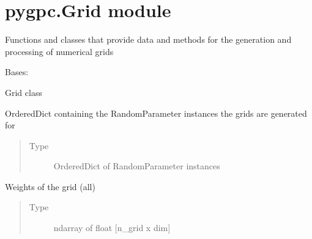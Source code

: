 \documentclass[letterpaper,10pt,english,openany,oneside]{sphinxmanual}
\begin{document}
\section{pygpc.Grid module}
\label{\detokenize{pygpc:module-pygpc.Grid}}\label{\detokenize{pygpc:pygpc-grid-module}}
Functions and classes that provide data and methods for the generation and processing of numerical grids

\begin{fulllineitems}
\label{\detokenize{pygpc:pygpc.Grid.Grid}}
Bases: 

Grid class

\begin{fulllineitems}
\label{\detokenize{pygpc:pygpc.Grid.Grid.parameters_random}}
OrderedDict containing the RandomParameter instances the grids are generated for
\begin{quote}\begin{description}
\item[{Type}] \leavevmode
OrderedDict of RandomParameter instances

\end{description}\end{quote}

\end{fulllineitems}


\begin{fulllineitems}
\label{\detokenize{pygpc:pygpc.Grid.Grid._weights}}
Weights of the grid (all)
\begin{quote}\begin{description}
\item[{Type}] \leavevmode
ndarray of float {[}n\_grid x dim{]}

\end{description}\end{quote}

\end{fulllineitems}



\end{fulllineitems}
\end{document}
